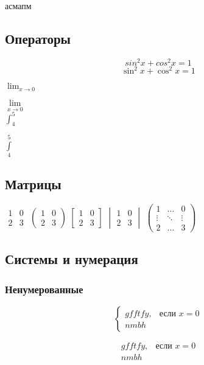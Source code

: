 \documentclass[12pt]{article}
\begin{document}
ас\!мапм

\subsection{Операторы}

$$sin^2x+cos^2x=1$$
$$\sin^2x+\cos^2x=1$$

$\lim_{x \to 0}$

$\lim\limits_{x \to 0}$\\

$\int_4^5$

$\int\limits_4^5$

\subsection{Матрицы}

$\begin{matrix}
1 & 0\\ 
2 & 3
\end{matrix}$
$\begin{pmatrix}
1 & 0\\ 
2 & 3
\end{pmatrix}$
$\begin{bmatrix}
1 & 0\\ 
2 & 3
\end{bmatrix}$
$\begin{vmatrix}
1 & 0\\ 
2 & 3
\end{vmatrix}$
$\begin{pmatrix}
1 & \dots & 0\\ 
\vdots & \ddots & \vdots\\
2 & \dots & 3
\end{pmatrix}$


\subsection{Системы и нумерация}
\subsubsection{Ненумерованные}
$$\begin{cases}
gfftfy, & \text{если $x=0$}\\
nmb h
\end{cases}$$

$$\begin{aligned}
gfftfy, & \text{если $x=0$}\\
nmb h
\end{aligned}$$
\end{document}

